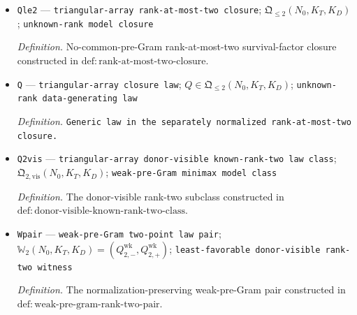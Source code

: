 \documentclass{article}
\begin{document}
\begin{itemize}
  \par\smallskip\noindent\emph{Definition.} Put \(n_D=N_0K_D\), \(h_0=s_-g_-\),
\[
 c_\dagger=2^{-24}r^{-4}h_0^4\gamma_-^8\kappa_-^4
 \{1+\bar\tau+L+M_b+M_z+M_\star+\gamma_+\}^{-8},
\]
and
\[
 \upsilon_r=
 \mathbf1\{r\ge2\}\left\{K_T^{-1}+N_0^{-1/2}K_D^{-1}
 +\rho_r\eta_D(K_D)+e^{-c_\dagger K_T/2}
 +e^{-c_\dagger n_D/2}\right\}
 +n_D^{-1}+e^{-c_\dagger n_D/2}.
\]
Define
\[
 \omega_r(N_0,K_T,K_D;\alpha)
 =C_\omega\varepsilon_{N_0,K_T,K_D}(\alpha)^{-1/2}\upsilon_r,
\]
where the fixed \(C_\omega<\infty\) depends only on the displayed model constants and is chosen sufficiently large to dominate the nonlinear Taylor remainder and aggregate fallback contributions.
  \item \texttt{Qle2} --- \texttt{triangular-\allowbreak{}array rank-\allowbreak{}at-\allowbreak{}most-\allowbreak{}two closure}; \(\mathfrak Q_{\leq2}(N_0,K_T,K_D)\); \texttt{unknown-\allowbreak{}rank model closure}
  \par\smallskip\noindent\emph{Definition.} No-common-pre-Gram rank-at-most-two survival-factor closure constructed in \(\mathrm{def:rank\mbox{-}at\mbox{-}most\mbox{-}two\mbox{-}closure}\).
  \item \texttt{Q} --- \texttt{triangular-\allowbreak{}array closure law}; \(Q\in\mathfrak Q_{\leq2}(N_0,K_T,K_D)\); \texttt{unknown-\allowbreak{}rank data-\allowbreak{}generating law}
  \par\smallskip\noindent\emph{Definition.} \texttt{Generic law in the separately normalized rank-\allowbreak{}at-\allowbreak{}most-\allowbreak{}two closure.}
  \item \texttt{Q2vis} --- \texttt{triangular-\allowbreak{}array donor-\allowbreak{}visible known-\allowbreak{}rank-\allowbreak{}two law class}; \(\mathfrak Q_{2,\mathrm{vis}}(N_0,K_T,K_D)\); \texttt{weak-\allowbreak{}pre-\allowbreak{}Gram minimax model class}
  \par\smallskip\noindent\emph{Definition.} The donor-visible rank-two subclass constructed in \(\mathrm{def:donor\mbox{-}visible\mbox{-}known\mbox{-}rank\mbox{-}two\mbox{-}class}\).
  \item \texttt{Wpair} --- \texttt{weak-\allowbreak{}pre-\allowbreak{}Gram two-\allowbreak{}point law pair}; \(\mathbb W_2(N_0,K_T,K_D)=(Q_{2,-}^{\mathrm{wk}},Q_{2,+}^{\mathrm{wk}})\); \texttt{least-\allowbreak{}favorable donor-\allowbreak{}visible rank-\allowbreak{}two witness}
  \par\smallskip\noindent\emph{Definition.} The normalization-preserving weak-pre-Gram pair constructed in \(\mathrm{def:weak\mbox{-}pre\mbox{-}gram\mbox{-}rank\mbox{-}two\mbox{-}pair}\).

\end{itemize}
\end{document}
